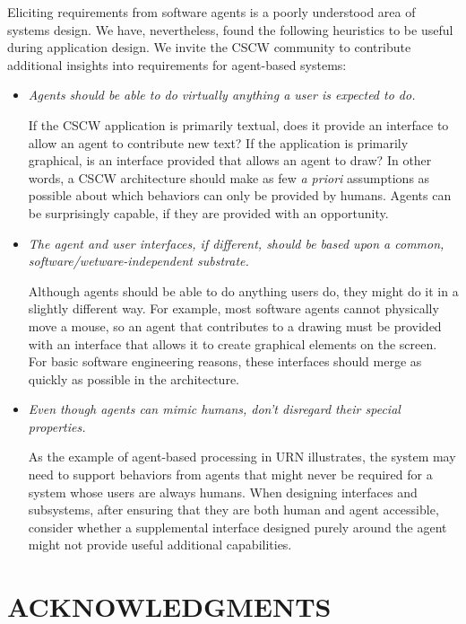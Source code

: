 Eliciting requirements from software agents is a poorly understood area of
systems design.  We have, nevertheless, found the following heuristics to
be useful during application design. We invite the CSCW community to 
contribute additional insights into requirements for agent-based systems:

\begin{itemize}
\item {\em Agents should be able to do virtually anything a user is
  expected to do.}

  If the CSCW application is primarily textual, does it provide an
  interface to allow an agent to contribute new text?  If the application
  is primarily graphical, is an interface provided that allows an agent to
  draw?  In other words, a CSCW architecture should  make as few {\em a
  priori} assumptions as possible about which behaviors can only be
  provided by humans.  Agents can be surprisingly capable, if they are
  provided with an opportunity.

\item {\em The agent and user interfaces, if different, should be based
  upon a common, software/wetware-independent substrate.}

  Although agents should be able to do anything users do, they might do
  it in a slightly different way. For example, most software agents
  cannot physically move a mouse, so an agent that contributes to a
  drawing must be provided with an interface that allows it to create
  graphical elements on the screen.  For basic software engineering reasons, 
  these interfaces should merge as quickly as possible in the architecture.  

\item {\em Even though agents can mimic humans, don't disregard their
  special properties.}

  As the example of agent-based processing in URN illustrates, the system
  may need to support behaviors from agents that might never be required
  for a system whose users are always humans. When designing interfaces and
  subsystems, after ensuring that they are both human and agent accessible,
  consider whether a supplemental interface designed purely around the 
  agent might not provide useful additional capabilities. 

\end{itemize}


\section{ACKNOWLEDGMENTS}


